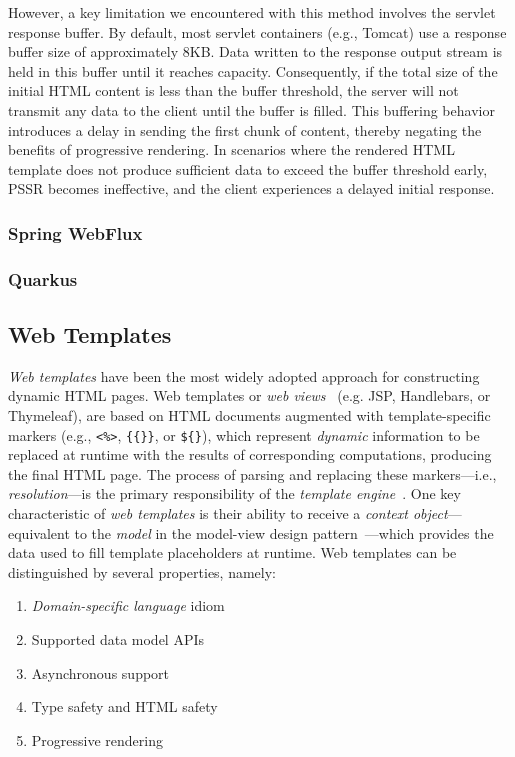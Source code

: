 However, a key limitation we encountered with this method involves the servlet
response buffer. By default, most servlet containers (e.g., Tomcat) use a
response buffer size of approximately 8KB. Data written to the response output
stream is held in this buffer until it reaches capacity. Consequently, if the
total size of the initial HTML content is less than the buffer threshold, the
server will not transmit any data to the client until the buffer is filled.
This buffering behavior introduces a delay in sending the first chunk of
content, thereby negating the benefits of progressive rendering. In scenarios
where the rendered HTML template does not produce sufficient data to exceed the
buffer threshold early, PSSR becomes ineffective, and the client experiences a
delayed initial response.

\subsubsection{Spring WebFlux}

\subsubsection{Quarkus}


\subsection{Web Templates}

\textit{Web templates} have been the most widely adopted approach for
constructing dynamic HTML pages.
Web templates or \textit{web views}~\cite{Fowler02,Alur01} (e.g. JSP, Handlebars,
or Thymeleaf), are based on HTML documents augmented with template-specific
markers (e.g., \texttt{<\%>}, \texttt{\{\{\}\}}, or \texttt{\$\{\}}), which
represent \textit{dynamic} information to be replaced at runtime with the
results of corresponding computations, producing the final HTML page.
The process of parsing and replacing these markers---i.e.,
\textit{resolution}---is the primary responsibility of the \textit{template
  engine}~\cite{Parr04}.
One key characteristic of \textit{web templates} is their ability to receive a
\textit{context object}---equivalent to the \textit{model} in the model-view
design pattern~\cite{mvc88,Parr04}---which provides the data used to fill
template placeholders at runtime.
Web templates can be distinguished by several properties, namely:
\begin{enumerate}
  \item \textit{Domain-specific language} idiom
  \item Supported data model APIs
  \item Asynchronous support
  \item Type safety and HTML safety
  \item Progressive rendering
\end{enumerate}

